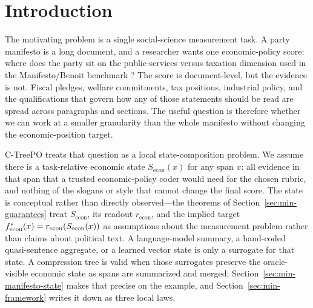\section{Introduction}\label{sec:min-introduction}

The motivating problem is a single social-science measurement task. A party manifesto is a long document, and a researcher wants one
economic-policy score: where does the party sit on the public-services versus
taxation dimension used in the Manifesto/Benoit benchmark
\citep{BenoitEtAl2025,ManifestoProject2025a}? The score is document-level,
but the evidence is not. Fiscal pledges, welfare commitments, tax positions,
industrial policy, and the qualifications that govern how any of those
statements should be read are spread across paragraphs and sections. The
useful question is therefore whether we can work at a smaller granularity
than the whole manifesto without changing the economic-position target.

C-TreePO treats that question as a local state-composition problem. We
assume there is a task-relative economic state $S_{\mathrm{econ}}(x)$ for any
span $x$: all evidence in that span that a trusted economic-policy coder
would need for the chosen rubric, and nothing of the slogans or style that
cannot change the final score. The state is conceptual rather than directly
observed---the theorems of Section~\ref{sec:min-guarantees} treat
$S_{\mathrm{econ}}$, its readout $r_{\mathrm{econ}}$, and the implied
target
$f^\ast_{\mathrm{econ}}(x) = r_{\mathrm{econ}}\!\left(S_{\mathrm{econ}}(x)\right)$
as assumptions about the measurement problem rather than claims about
political text. A language-model summary, a hand-coded quasi-sentence
aggregate, or a learned vector state is only a surrogate for that state. A
compression tree is valid when those surrogates preserve the oracle-visible
economic state as spans are summarized and merged;
Section~\ref{sec:min-manifesto-state} makes that precise on the example, and
Section~\ref{sec:min-framework} writes it down as three local laws.

